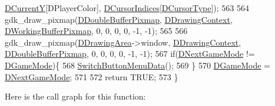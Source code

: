 \begin{DoxyCode}
      \hyperlink{classCApplicationData_a0ba39779ae11c8072258c6ddfebd6052}{DCurrentY}[DPlayerColor], \hyperlink{classCApplicationData_a3f4e69d928f933bba6e1c388c5a720a2}{DCursorIndices}[\hyperlink{classCApplicationData_a931cfbda23231fb441081f231326e7ee}{DCursorType}]);   
563     
564     gdk\_draw\_pixmap(\hyperlink{classCApplicationData_aefb64ec5ca3f791f6d431cfc56b9f3b3}{DDoubleBufferPixmap}, \hyperlink{classCApplicationData_aa6c5bea9bdcc64398e5a3f693661d37c}{DDrawingContext}, 
      \hyperlink{classCApplicationData_afa34cf2780f38dd28c0c811e69d60a97}{DWorkingBufferPixmap}, 0, 0, 0, 0, -1, -1);
565     
566     gdk\_draw\_pixmap(\hyperlink{classCApplicationData_a4735f5d31632313e0b2a1659eb178987}{DDrawingArea}->window, \hyperlink{classCApplicationData_aa6c5bea9bdcc64398e5a3f693661d37c}{DDrawingContext}, 
      \hyperlink{classCApplicationData_aefb64ec5ca3f791f6d431cfc56b9f3b3}{DDoubleBufferPixmap}, 0, 0, 0, 0, -1, -1);
567     \textcolor{keywordflow}{if}(\hyperlink{classCApplicationData_a3b67edeacd70201dcf96fa9fa8aa2107}{DNextGameMode} != \hyperlink{classCApplicationData_a2f906f2b4208ecb2a057e6b62e549685}{DGameMode})\{
568         \hyperlink{classCApplicationData_a2a464fd480c791ab13a1b1ca855e4578}{SwitchButtonMenuData}();
569     \}
570     \hyperlink{classCApplicationData_a2f906f2b4208ecb2a057e6b62e549685}{DGameMode} = \hyperlink{classCApplicationData_a3b67edeacd70201dcf96fa9fa8aa2107}{DNextGameMode};
571     
572     \textcolor{keywordflow}{return} TRUE;
573 \}
\end{DoxyCode}
Here is the call graph for this function\+:\nopagebreak
